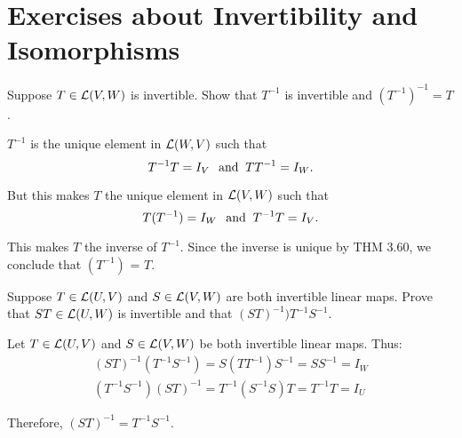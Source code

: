 \section*{Exercises about Invertibility and Isomorphisms}

\begin{xrcs}
  Suppose $T \in \mathcal{L}(V,W)$ is invertible. Show that $T^{-1}$ is invertible and $(T^{-1})^{-1} = T$.

  \begin{xprf}
    $T^{-1}$ is the unique element in $\mathcal{L}(W,V)$ such that
    \begin{equation}
      T^{-1} T = I_V \;\;\, \text{and}\;\; TT^{-1} = I_W.
    \end{equation}

    But this makes $T$ the unique element in $\mathcal{L}(V,W)$ such that
    \begin{equation}
      T(T^{-1}) = I_W \;\;\, \text{and}\;\; T^{-1} T = I_V.
    \end{equation}

    This makes $T$ the inverse of $T^{-1}$. Since the inverse is unique by THM 3.60, we conclude that $(T^{-1})$ = $T$.
  \end{xprf}
\end{xrcs}

\begin{xrcs}
  Suppose $T \in \mathcal{L}(U,V)$ and $S \in \mathcal{L}(V,W)$ are both invertible linear maps. Prove that $ST \in \mathcal{L}(U,W)$ is invertible and that $(ST)^{-1} ) T^{-1} S^{-1}$.

  \begin{xprf}
    Let $T \in \mathcal{L}(U,V)$ and $S \in \mathcal{L}(V,W)$ be both invertible linear maps. Thus:
    \begin{equation}
      \begin{aligned}
        (ST)^{-1} (T^{-1} S^{-1}) = S (T T^{-1}) S^{-1}
                                  = S S^{-1}
                                  = I_W \\
        (T^{-1} S^{-1}) (ST)^{-1} = T^{-1} (S^{-1} S) T
                                  = T^{-1} T
                                  = I_U
      \end{aligned}
    \end{equation}

    Therefore, $(ST)^{-1} = T^{-1} S^{-1}$.
  \end{xprf}
\end{xrcs}

